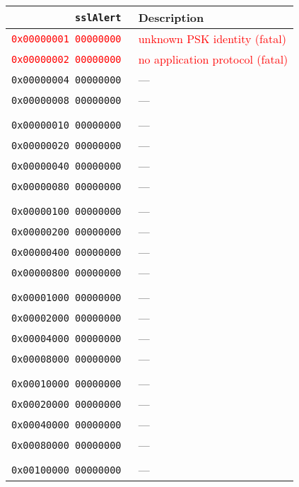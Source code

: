 \documentclass[documentation]{subfiles}
\begin{document}
\begin{minipage}{.48\textwidth}
    \small
    \begin{longtable}{>{\tt}rl}
        \toprule
        {\bf sslAlert} & {\bf Description} \\
        \midrule\endhead%
        \textcolor{red}   {0x00000001 00000000} & \textcolor{red}{unknown PSK identity (fatal)}\\
        \textcolor{red}   {0x00000002 00000000} & \textcolor{red}{no application protocol (fatal)}\\
                           0x00000004 00000000  & ---\\
                           0x00000008 00000000  & ---\\
        \\
                           0x00000010 00000000  & ---\\
                           0x00000020 00000000  & ---\\
                           0x00000040 00000000  & ---\\
                           0x00000080 00000000  & ---\\
        \\
                           0x00000100 00000000  & ---\\
                           0x00000200 00000000  & ---\\
                           0x00000400 00000000  & ---\\
                           0x00000800 00000000  & ---\\
        \\
                           0x00001000 00000000  & ---\\
                           0x00002000 00000000  & ---\\
                           0x00004000 00000000  & ---\\
                           0x00008000 00000000  & ---\\
        \\
                           0x00010000 00000000  & ---\\
                           0x00020000 00000000  & ---\\
                           0x00040000 00000000  & ---\\
                           0x00080000 00000000  & ---\\
        \\
                           0x00100000 00000000  & ---\\

\end{longtable}
\end{minipage}
\end{document}
